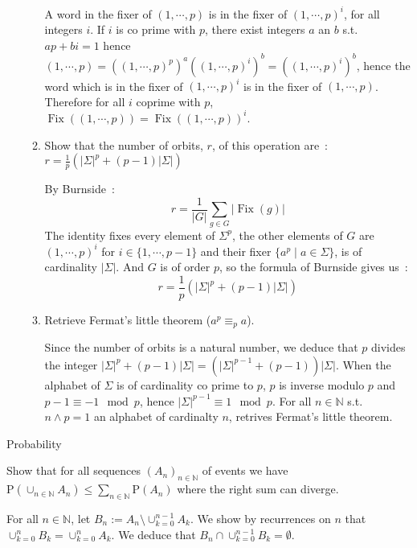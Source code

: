 \documentclass[a4paper,11pt]{exam}
\newcommand{\N}{\mathbb{N}}
\renewcommand{\P}{\mathrm{P}}
\DeclareMathOperator{\Fix}{Fix}
\begin{document}
\begin{questions}
\begin{enumerate}
\begin{enumerate}
\begin{solution}
			A word in the fixer of $(1,\cdots,p)$ is in the fixer of $(1,\cdots,p)^i$, for all integers $i$.
			If $i$ is co prime with $p$, there exist  integers $a$ an $b$ s.t. $ap+bi=1$ hence $(1,\cdots,p)=((1,\cdots,p)^p)^a((1,\cdots,p)^i)^b=((1,\cdots,p)^i)^b$, hence the word which is in the fixer of $(1,\cdots,p)^i$ is in the fixer of $(1,\cdots,p)$.
			Therefore for all $i$ coprime with $p$, $\Fix((1,\cdots,p))=\Fix((1,\cdots,p))^i$.
		\end{solution}
		
		\item Show that the number of orbits, $r$, of this operation are~:
	$
		r = \frac{1}{p} (|\Sigma|^p + (p-1) |\Sigma|)
	$
		
		\begin{solution}
			By Burnside~:
			\[
			r = \frac{1}{|G|}\sum_{g \in G}|\Fix(g)|
			\]
			The identity fixes every element of  $\Sigma^p$, the other elements of $G$ are $(1,\cdots,p)^i$ for $i \in \{1,\cdots,p-1 \}$ and their fixer $\{ a^p \mid a \in \Sigma \}$, is of cardinality $|\Sigma|$.
			And $G$ is of order $p$, so the formula of Burnside gives us~:
			\[
			r = \frac{1}{p}(|\Sigma|^p+(p-1)|\Sigma|)
			\]
		\end{solution}
		
		\item Retrieve Fermat's little theorem ($a^{p} \equiv_p a$).
		
		\begin{solution}
			Since the number of orbits is a natural number, we deduce that  $p$ divides the integer $|\Sigma|^p+(p-1)|\Sigma| =
			(|\Sigma|^{p-1}+(p-1))|\Sigma|$.
			When the alphabet of $\Sigma$ is of cardinality co prime to $p$, $p$ is inverse modulo $p$ and $p-1 \equiv -1 \mod p$, hence $|\Sigma|^{p-1} \equiv 1 \mod p$.
			For all $n\in\N$ s.t. $n \wedge p = 1$ an alphabet of cardinalty $n$, retrives Fermat's little theorem.		\end{solution}
	\end{enumerate}
\end{enumerate}
\begin{EnvFullwidth}
	\colorbox{gris}{
		\begin{minipage}[c]{\textwidth}
			Probability
		\end{minipage}
	}
\end{EnvFullwidth}
\question
Show that for all sequences $(A_n)_{n \in \N}$ of events we have
$
\P(\cup_{n \in \N}A_n) \leq \sum_{n \in \N}\P(A_n)
$
where the right sum can diverge.

\begin{solution}
	For all $n \in \N$, let $B_n := A_n \setminus \cup_{k = 0}^{n-1}A_k$.
	We show by recurrences on $n$ that $\cup_{k = 0}^nB_k = \cup_{k = 0}^nA_k$.
	We deduce that $B_n \cap \cup_{k = 0}^{n-1}B_k = \emptyset$.
	

\end{solution}
\end{questions}
\end{document}
